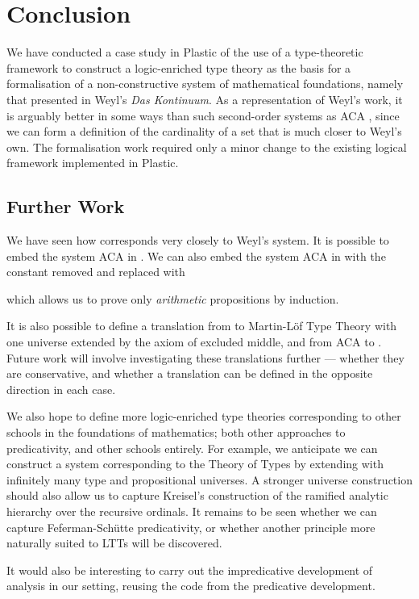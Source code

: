 \documentclass[acmtocl]{acmtrans2m}
\begin{document}
\section{Conclusion}

We have conducted a case study in Plastic of the use of a type-theoretic
framework to construct a logic-enriched type theory as the basis for
a formalisation of a non-constructive system of mathematical
foundations, namely that presented in Weyl's \textit{Das Kontinuum}.
As a representation of Weyl's work, it is arguably better in some
ways than such second-order systems as ACA
\cite{feferman:kontinuum}, since we can form a definition of the
cardinality of a set that is much closer to Weyl's own.  The
formalisation work required only a minor change to the existing
logical framework implemented in Plastic.

\subsection{Further Work}

We have seen how  corresponds very closely to Weyl's system.  It is possible to embed the system ACA in . We can also embed the system ACA in  with the constant  removed and replaced with

which allows us to prove only \emph{arithmetic} propositions by induction.

It is also possible to define a translation from  to Martin-L\"of Type Theory with one universe extended by the axiom of excluded middle, and from ACA to .
Future work will involve investigating these translations further --- whether they are conservative, and whether a translation can be defined in the opposite direction in each case.

We also hope to define more logic-enriched type theories corresponding to other schools in the foundations of mathematics; both other approaches to predicativity, and other schools entirely.  For example, we anticipate we can construct a system corresponding to the Theory of Types by extending  with infinitely many type and propositional universes.  A stronger universe construction should also allow us to capture Kreisel's construction of the ramified analytic hierarchy over the recursive ordinals.  It remains to be seen whether we can capture Feferman-Sch\"utte predicativity, or whether another principle more naturally suited to LTTs will be discovered.

It would also be interesting to
carry out the impredicative development of analysis in our setting,
reusing the code from the predicative development.
\end{document}
